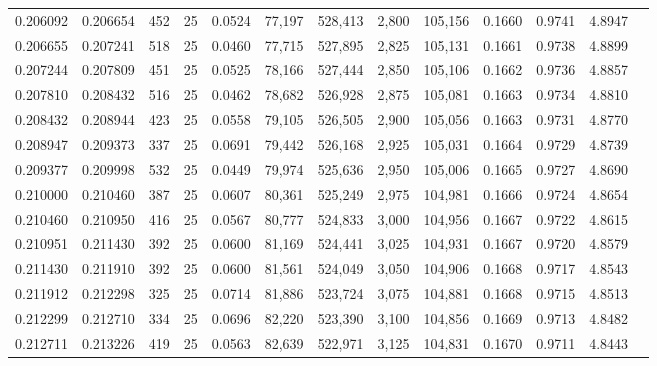 \begin{tabular}{rrrrrrrrrrrrr}
0.206092 & 0.206654 &   452 &  25 &                                     0.0524 &  77,197 & 528,413 &   2,800 & 105,156 & 0.1660 & 0.9741 & 4.8947 \\
0.206655 & 0.207241 &   518 &  25 &                                     0.0460 &  77,715 & 527,895 &   2,825 & 105,131 & 0.1661 & 0.9738 & 4.8899 \\
0.207244 & 0.207809 &   451 &  25 &                                     0.0525 &  78,166 & 527,444 &   2,850 & 105,106 & 0.1662 & 0.9736 & 4.8857 \\
0.207810 & 0.208432 &   516 &  25 &                                     0.0462 &  78,682 & 526,928 &   2,875 & 105,081 & 0.1663 & 0.9734 & 4.8810 \\
0.208432 & 0.208944 &   423 &  25 &                                     0.0558 &  79,105 & 526,505 &   2,900 & 105,056 & 0.1663 & 0.9731 & 4.8770 \\
0.208947 & 0.209373 &   337 &  25 &                                     0.0691 &  79,442 & 526,168 &   2,925 & 105,031 & 0.1664 & 0.9729 & 4.8739 \\
0.209377 & 0.209998 &   532 &  25 &                                     0.0449 &  79,974 & 525,636 &   2,950 & 105,006 & 0.1665 & 0.9727 & 4.8690 \\
0.210000 & 0.210460 &   387 &  25 &                                     0.0607 &  80,361 & 525,249 &   2,975 & 104,981 & 0.1666 & 0.9724 & 4.8654 \\
0.210460 & 0.210950 &   416 &  25 &                                     0.0567 &  80,777 & 524,833 &   3,000 & 104,956 & 0.1667 & 0.9722 & 4.8615 \\
0.210951 & 0.211430 &   392 &  25 &                                     0.0600 &  81,169 & 524,441 &   3,025 & 104,931 & 0.1667 & 0.9720 & 4.8579 \\
0.211430 & 0.211910 &   392 &  25 &                                     0.0600 &  81,561 & 524,049 &   3,050 & 104,906 & 0.1668 & 0.9717 & 4.8543 \\
0.211912 & 0.212298 &   325 &  25 &                                     0.0714 &  81,886 & 523,724 &   3,075 & 104,881 & 0.1668 & 0.9715 & 4.8513 \\
0.212299 & 0.212710 &   334 &  25 &                                     0.0696 &  82,220 & 523,390 &   3,100 & 104,856 & 0.1669 & 0.9713 & 4.8482 \\
0.212711 & 0.213226 &   419 &  25 &                                     0.0563 &  82,639 & 522,971 &   3,125 & 104,831 & 0.1670 & 0.9711 & 4.8443 \\

\end{tabular}
